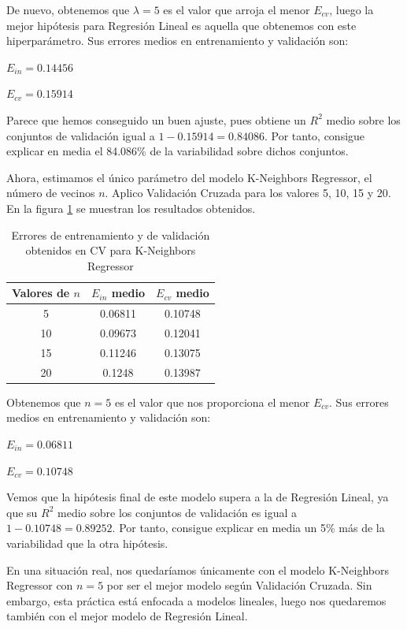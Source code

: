 \documentclass[10pt,a4paper]{article}
\begin{document}
De nuevo, obtenemos que $\lambda = 5$ es el valor que arroja el menor $E_{cv}$, luego la mejor hipótesis para Regresión Lineal es aquella que obtenemos con este hiperparámetro. Sus errores medios en entrenamiento y validación son:

$E_{in} = 0.14456$

$E_{cv} = 0.15914$

Parece que hemos conseguido un buen ajuste, pues obtiene un $R^2$ medio sobre los conjuntos de validación igual a $1-0.15914=0.84086$. Por tanto, consigue explicar en media el 84.086\% de la variabilidad sobre dichos conjuntos.

Ahora, estimamos el único parámetro del modelo K-Neighbors Regressor, el número de vecinos $n$. Aplico Validación Cruzada para los valores 5, 10, 15 y 20. En la figura \ref{fig:reg_knr_cv} se muestran los resultados obtenidos.

\begin{table}[h]
	\centering
	\begin{tabular}{|c|c|c|}
		\hline
		\textbf{Valores de $n$} & \textbf{$E_{in}$ medio} & \textbf{$E_{cv}$ medio} \\ \hline
		5                       & 0.06811                 & 0.10748                 \\ \hline
		10                      & 0.09673                 & 0.12041                 \\ \hline
		15                      & 0.11246                 & 0.13075                 \\ \hline
		20                      & 0.1248                  & 0.13987                 \\ \hline
	\end{tabular}
	\caption{Errores de entrenamiento y de validación obtenidos en CV para K-Neighbors Regressor}
	\label{fig:reg_knr_cv}
\end{table}

Obtenemos que $n = 5$ es el valor que nos proporciona el menor $E_{cv}$. Sus errores medios en entrenamiento y validación son:

$E_{in} = 0.06811$

$E_{cv} = 0.10748$

Vemos que la hipótesis final de este modelo supera a la de Regresión Lineal, ya que su $R^2$ medio sobre los conjuntos de validación es igual a $1-0.10748=0.89252$. Por tanto, consigue explicar en media un 5\% más de la variabilidad que la otra hipótesis.

En una situación real, nos quedaríamos únicamente con el modelo K-Neighbors Regressor con $n=5$ por ser el mejor modelo según Validación Cruzada. Sin embargo, esta práctica está enfocada a modelos lineales, luego nos quedaremos también con el mejor modelo de Regresión Lineal.
\end{document}

